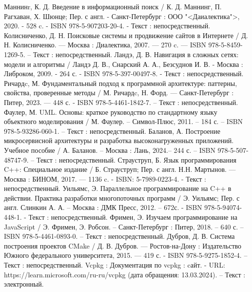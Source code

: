
\begin{thebibliography}{51}
	 Маннинr, К. Д. Введение в информационный поиск / К. Д. Маннинг, П. Рагхаван, Х. Шюнце; Пер. с англ. - Санкт-Петербург : ООО "<Даиалектика">, 2020. - 528 c. - ISBN  978-5-907203-20-4. - Текст : непосредственный.
	 Колисниченко, Д. Н. Поисковые системы и продвижение сайтов в Интернете / Д. Н. Колисниченко. — Москва : Диалектика, 2007. — 270 c. — ISBN 978-5-8459-1269-5. – Текст : непосредственный.
	 Ландэ, Д. В. Навигация в сложных сетях: модели и алгоритмы / Ландэ Д. В., Снарский А. А., Безсуднов И. В. - Москва : Либроком, 2009. - 264 с. - ISBN 978-5-397-00497-8. - Текст : непосредственный.
	 Ричардc, М. Фундаментальный подход к программной архитектуре: паттерны, свойства, проверенные методы / М. Ричардc, Н. Форд. — Санкт-Петербург : Питер, 2023. — 448 с. - ISBN 978-5-4461-1842-7. – Текст : непосредственный.
	 Фаулер, М. UML. Основы: краткое руководство по стандартному языку объектного моделирования / М. Фаулер. – Символ-Плюс, 2011. – 184 с. – ISBN 978-5-93286-060-1. – Текст : непосредственный.
     Баланов, А. Построение микросервисной архитектуры и разработка высоконагруженных приложений. Учебное пособие / А. Баланов. – Москва : Лань, 2024.– 244 с. – ISBN 978-5-507-48747-9. – Текст : непосредственный.
	 Страуструп, Б. Язык программирования C++: Специальное издание / Б. Страуструп; Пер. с англ. Н.Н. Мартынов. — Москва : БИНОМ, 2017. — 1136 c. - ISBN: 5-7989-0223-4. - Текст : непосредственный.
	 Уильямс, Э. Параллельное программирование на C++ в действии. Практика разработки многопоточных программ / Э. Уильямс; Пер. с англ. Слинкин А. А. – Москва : ДМК Пресс, 2012. – 672с. - ISBN 978-5-94074-448-1. - Текст : непосредственный.
	  Фримен, Э. Изучаем программирование на JavaScript / Э. Фримен, Э. Робсон. – Санкт-Петербург : Питер, 2018. – 640 с. – ISBN 978-5-4461-0893-0. – Текст : непосредственный.	
	 Дубров, Д. В. Система построения проектов CMake / Д. В. Дубров. — Ростов-на-Дону : Издательство Южного федерального университета, 2015. — 419 с. - ISBN 978-5-9275-1852-4. – Текст : непосредственный.
	 Vcpkg : Документация по vcpkg : cайт. - URL: https://learn.microsoft.com/ru-ru/vcpkg (дата обращения: 13.03.2024). – Текст : электронный.

\end{thebibliography}
